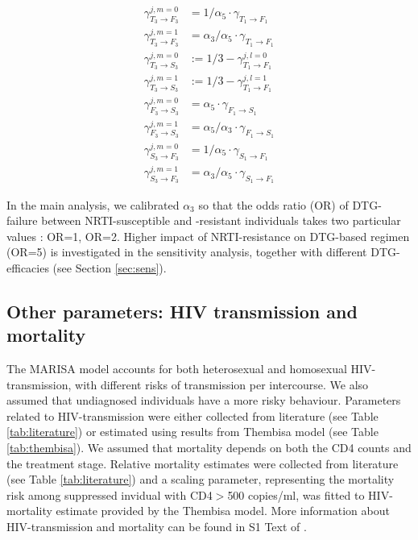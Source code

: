 \documentclass{article}
\begin{document}
\begin{align}
\gamma^{j,m=0}_{T_3\rightarrow F_3}&= 1/\alpha_5 \cdot \gamma_{T_1\rightarrow F_1}\label{eq1:nrti_res}\\[8pt]
\gamma^{j,m=1}_{T_3\rightarrow F_3}&= \alpha_3/\alpha_5 \cdot \gamma_{T_1\rightarrow F_1}\\[8pt]
\gamma^{j,m=0}_{T_3\rightarrow S_3}&:=1/3 - \gamma^{j,l=0}_{T_1\rightarrow F_1}\\[8pt]
\gamma^{j,m=1}_{T_3\rightarrow S_3}&:=1/3 - \gamma^{j,l=1}_{T_1\rightarrow F_1}\\[8pt]
\gamma^{j,m=0}_{F_3\rightarrow S_3}&=\alpha_5\cdot \gamma_{F_1\rightarrow S_1}\\[8pt]
\gamma^{j,m=1}_{F_3\rightarrow S_3}&=\alpha_5/\alpha_3\cdot \gamma_{F_1\rightarrow S_1}\\[8pt]
\gamma^{j,m=0}_{S_3\rightarrow F_3}&= 1/\alpha_5 \cdot \gamma_{S_1\rightarrow F_1}\\[8pt]
\gamma^{j,m=1}_{S_3\rightarrow F_3}&= \alpha_3/\alpha_5 \cdot \gamma_{S_1\rightarrow F_1}\label{eq8:nrti_res}
\end{align}

In the main analysis, we calibrated $\alpha_3$ so that the odds ratio (OR) of DTG-failure between NRTI-susceptible and -resistant individuals takes two particular values : OR=1, OR=2. Higher impact of NRTI-resistance on DTG-based regimen (OR=5) is investigated in the sensitivity analysis, together with different DTG-efficacies (see Section \ref{sec:sens}).

\subsection{Other parameters: HIV transmission and mortality}
The MARISA model accounts for both heterosexual and homosexual HIV-transmission, with different risks of transmission per intercourse. We also assumed that undiagnosed individuals have a more risky behaviour. Parameters related to HIV-transmission were either collected from literature (see Table \ref{tab:literature}) or estimated using results from Thembisa model (see Table \ref{tab:thembisa}). We assumed that mortality depends on both the CD4 counts and the treatment stage. Relative mortality estimates were collected from literature (see Table \ref{tab:literature}) and a scaling parameter, representing the mortality risk among suppressed invidual with CD4$>$500 copies/ml, was fitted to HIV-mortality estimate provided by the Thembisa model. More information about HIV-transmission and mortality can be found in S1 Text of \cite{Hauser2019}.
\end{document}
